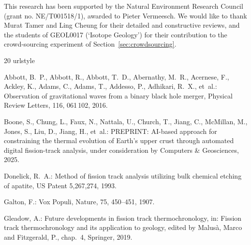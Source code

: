 \documentclass[gchron, manuscript]{copernicus}
\begin{document}

\begin{acknowledgements}
This research has been supported by the Natural Environment Research
Council (grant no. NE/T001518/1), awarded to Pieter Vermeesch. We
would like to thank Murat Tamer and Ling Cheung for their detailed and
constructive reviews, and the students of GEOL0017 (`Isotope Geology')
for their contribution to the crowd-sourcing experiment of
Section~\ref{sec:crowdsourcing}.
\end{acknowledgements}

\begin{thebibliography}{20}
\providecommand{\natexlab}[1]{#1}
\providecommand{\url}[1]{\texttt{#1}}
\providecommand{\urlprefix}{}
\expandafter\ifx\csname urlstyle\endcsname\relax
  \providecommand{\doi}[1]{https://doi.org/\discretionary{}{}{}#1}\else
  \providecommand{\doi}{https://doi.org/\discretionary{}{}{}\begingroup
  \urlstyle{rm}\Url}\fi

Abbott, B.~P., Abbott, R., Abbott, T.~D., Abernathy, M.~R., Acernese, F.,
  Ackley, K., Adams, C., Adams, T., Addesso, P., Adhikari, R.~X., et~al.:
  Observation of gravitational waves from a binary black hole merger, {Physical
  Review Letters}, 116, 061\,102, 2016.

Boone, S., Chung, L., Faux, N., Nattala, U., Church, T., Jiang, C., McMillan,
  M., Jones, S., Liu, D., Jiang, H., et~al.: {PREPRINT: AI-based approach for
  constraining the thermal evolution of Earth's upper crust through automated
  digital fission-track analysis}, under consideration by Computers \&
  Geosciences, 2025.

Donelick, R.~A.: Method of fission track analysis utilizing bulk chemical
  etching of apatite, {US Patent 5,267,274}, 1993.

Galton, F.: Vox Populi, Nature, 75, 450--451, 1907.

Gleadow, A.: {Future developments in fission track thermochronology}, in:
  {Fission track thermochronology and its application to geology}, edited by
  {Malus\`{a}, Marco and Fitzgerald, P.}, chap.~4, {Springer}, 2019.


\end{thebibliography}
\end{document}
